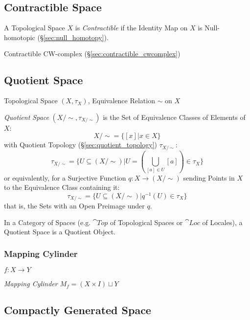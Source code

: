 \subsection{Contractible Space}\label{sec:contractible_space}

A Topological Space $X$ is \emph{Contractible} if the Identity Map on
$X$ is Null-homotopic (\S\ref{sec:null_homotopy}).

Contractible CW-complex (\S\ref{sec:contractible_cwcomplex})



\subsection{Quotient Space}\label{sec:quotient_space}

Topological Space $(X, \tau_X)$, Equivalence Relation $\sim$ on $X$

\emph{Quotient Space} $(X/\sim, \tau_{X/\sim})$ is the Set of Equivalence
Classes of Elements of $X$:
\[
  X / \sim = \{ [x] | x \in X \}
\]
with Quotient Topology (\S\ref{sec:quotient_topology}) $\tau_{X/\sim}$:
\[
  \tau_{X/\sim} = \{ U \subseteq (X/\sim) |
    U = (\bigcup_{[a] \in U} [a]) \in \tau_X \}
\]
or equivalently, for a Surjective Function $q : X \rightarrow (X /
\sim)$ sending Points in $X$ to the Equivalence Class containing it:
\[
  \tau_{X/\sim} = \{ U \subseteq (X/\sim) | q^{-1}(U) \in \tau_X \}
\]
that is, the Sets with an Open Preimage under $q$.

In a Category of Spaces (e.g. $\cat{Top}$ of Topological Spaces or
$\cat{Loc}$ of Locales), a Quotient Space is a Quotient Object.



\subsubsection{Mapping Cylinder}\label{sec:mapping_cylinder}

$f : X \rightarrow Y$

\emph{Mapping Cylinder} $M_f = (X \times I) \sqcup Y$



\subsection{Compactly Generated Space}\label{sec:compactly_generated}

